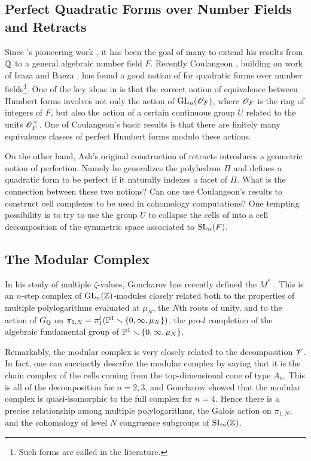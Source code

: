 \subsection{Perfect Quadratic Forms over Number Fields and Retracts}
%
Since \Vor 's pioneering work \cite{vor1}, it has been the goal of
many to extend his results from $\mathbb{Q}$ to a general algebraic number
field $F$.  Recently Coulangeon \cite{coul}, building on work of Icaza
and Baeza \cite{icaza, baeza.icaza}, has found a good notion of
 for quadratic forms over number
fields\footnote{Such forms are called  in the
literature.}.  One of the key ideas in \cite{coul} is that the correct
notion of equivalence between Humbert forms involves not only the
action of $\operatorname{GL}_{n} (\mathscr O_{F})$, where $\mathscr O_{F}$ is the ring of integers
of $F$, but also the action of a certain continuous group $U$ related
to the units $\mathscr O_{F}^{\times }$.  One of Coulangeon's basic results
is that there are finitely many equivalence classes of perfect Humbert
forms modulo these actions.

On the other hand, Ash's original construction of retracts
\cite{ash77} introduces a geometric notion of perfection.  Namely he
generalizes the \Vor polyhedron $\Pi$ and defines a quadratic form to
be perfect if it naturally indexes a facet of $\Pi$.  What is the
connection between these two notions?  Can one use Coulangeon's
results to construct cell complexes to be used in cohomology
computations?  One tempting possibility is to try to use the group $U$ 
to collapse the \Vor cells of \cite{ash77} into a
cell decomposition of the symmetric space associated to $\operatorname{SL}_{n} (F)$.

\subsection{The Modular Complex}
%
In his study of multiple $\zeta$-values, Goncharov has recently defined
the  $M^{*}$ \cite{gonch1, gonch2}.  This is an
$n$-step complex of $\operatorname{GL}_{n} (\mathbb{Z})$-modules closely related both to the
properties of multiple polylogarithms evaluated at $\mu_{N}$, the
$N$th roots of unity, and to the action of $G_{\mathbb{Q}}$ on $\pi_{1,N} =
\pi_{1}^{l} ({\mathbb P}^{1}\smallsetminus \{0,\infty ,\mu_{N} \})$, the
pro-$l$ completion of the algebraic fundamental group of
${\mathbb P}^{1}\smallsetminus \{0,\infty ,\mu_{N} \}$.  

Remarkably, the modular complex is very closely related to the \Vor
decomposition $\mathscr V$.  In fact, one can succinctly describe the modular
complex by saying that it is the chain complex of the cells coming
from the top-dimensional \Vor cone of type $A_{n}$.  This is all of
the \Vor decomposition for $n=2,3$, and Goncharov showed that the
modular complex is quasi-isomorphic to the full \Vor complex for
$n=4$.  Hence there is a precise relationship among multiple
polylogarithms, the Galois action on $\pi_{1,N}$, and the cohomology
of level $N$ congruence subgroups of $\operatorname{SL}_{n} (\mathbb{Z})$.

